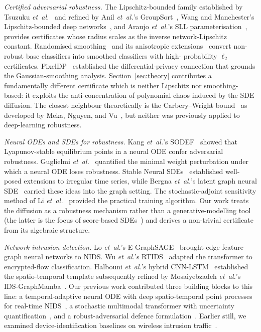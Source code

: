 \documentclass[journal,10pt]{IEEEtran}
\theoremstyle{definition}
\theoremstyle{remark}
\begin{document}
\emph{Certified adversarial robustness.} The Lipschitz-bounded family
established by Tsuzuku \textit{et~al.}~\cite{tsuzuku2018lipschitz}
and refined by Anil \textit{et~al.}'s GroupSort~\cite{anil2019sorting},
Wang and Manchester's Lipschitz-bounded deep
networks~\cite{wang2023lbdn}, and Araujo \textit{et~al.}'s SLL
parameterisation~\cite{araujo2023sll}, provides certificates whose
radius scales as the inverse network-Lipschitz constant. Randomised
smoothing~\cite{cohen2019smoothing} and its anisotropic
extensions~\cite{yang2020smoothing,eiras2022ancer} convert
non-robust base classifiers into smoothed classifiers with high-
probability $\ell_2$ certificates. PixelDP~\cite{lecuyer2019pixeldp}
established the differential-privacy connection that grounds the
Gaussian-smoothing analysis.
Section~\ref{sec:theory} contributes a fundamentally different
certificate which is neither Lipschitz nor smoothing-based: it
exploits the anti-concentration of polynomial chaos induced by the
SDE diffusion. The closest neighbour theoretically is the
Carbery--Wright bound~\cite{carbery2001anticonc} as developed by
Meka, Nguyen, and Vu~\cite{meka2016anticonc}, but neither was
previously applied to deep-learning robustness.

\emph{Neural ODEs and SDEs for robustness.} Kang \textit{et~al.}'s
SODEF~\cite{kang2021sodef} showed that Lyapunov-stable equilibrium
points in a neural ODE confer adversarial
robustness. Guglielmi \textit{et~al.}~\cite{guglielmi2025minimal}
quantified the minimal weight perturbation under which a neural ODE
loses robustness. Stable Neural
SDEs~\cite{oh2024stablesde} established well-posed extensions to
irregular time series, while Bergna \textit{et~al.}'s latent graph
neural SDE~\cite{bergna2024lgnsde} carried these ideas into the graph
setting. The stochastic-adjoint sensitivity method of
Li \textit{et~al.}~\cite{li2020scalable} provided the practical
training algorithm. Our work treats the diffusion as a robustness
mechanism rather than a generative-modelling tool (the latter is
the focus of score-based SDEs~\cite{song2021score}) and derives
a non-trivial certificate from its algebraic structure.

\emph{Network intrusion detection.} Lo \textit{et~al.}'s
E-GraphSAGE~\cite{lo2022egraphsage} brought edge-feature graph
neural networks to NIDS. Wu \textit{et~al.}'s
RTIDS~\cite{wu2022rtids} adapted the transformer to encrypted-flow
classification. Halbouni \textit{et~al.}'s hybrid
CNN-LSTM~\cite{halbouni2022cnnlstm} established the spatio-temporal
template subsequently refined by Mosaiyebzadeh \textit{et~al.}'s
IDS-GraphMamba~\cite{mosaiyebzadeh2025graphmamba}. Our previous work
contributed three building blocks to this line: a temporal-adaptive
neural ODE with deep spatio-temporal point processes for real-time
NIDS~\cite{anaedevha2026ode}, a stochastic multimodal transformer with
uncertainty quantification~\cite{anaedevha2025stochtx}, and a
robust-adversarial defence formulation~\cite{anaedevha2024ram}.
Earlier still, we examined device-identification baselines on
wireless intrusion traffic~\cite{anaedevha2024elcon}.
\end{document}
